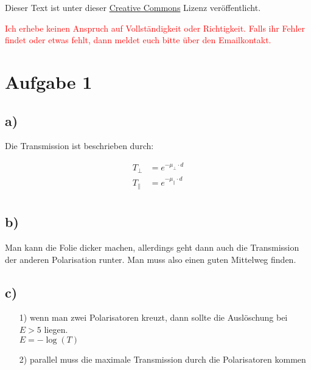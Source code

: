 




\maketitle

Dieser Text ist unter dieser \href{http://creativecommons.org/licenses/by-nc-sa/4.0/}{Creative Commons} Lizenz veröffentlicht.

\textcolor{red}{Ich erhebe keinen Anspruch auf Vollständigkeit oder Richtigkeit. Falls ihr Fehler findet oder etwas fehlt, dann meldet euch bitte über den Emailkontakt.}

\tableofcontents


\newpage



\section{Aufgabe 1}

\subsection*{a)}

Die Transmission ist beschrieben durch:

\begin{align*}
T_\perp &= e^{-\mu_\perp \cdot d} \\
T_\parallel &= e^{-\mu_\parallel \cdot d} \\
\end{align*}


\subsection*{b)}

Man kann die Folie dicker machen, allerdings geht dann auch die Transmission der anderen Polarisation runter. Man muss also einen guten Mittelweg finden.


\subsection*{c)}

\begin{itemize}
	\item[1)] wenn man zwei Polarisatoren kreuzt, dann sollte die Auslöschung bei $E > 5$ liegen. \\ $E = -\log(T)$
	\item[2)] parallel muss die maximale Transmission durch die Polarisatoren kommen
\end{itemize}


